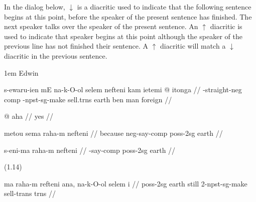 \documentclass[12pt]{article}
\begin{document}
In the dialog below, $\downarrow$ is a diacritic used to indicate that the
following sentence begins at this point, before the speaker of the present
sentence has finished.  The next speaker talks over the speaker of the present
sentence. An $\uparrow$ diacritic is used to indicate that speaker begins at
this point although the speaker of the previous line has not finished their
sentence. A $\uparrow$ diacritic will match a $\downarrow$ diacritic in the
previous sentence.

\bigskip

 1em Edwin

\begingl
\gla s-ewaru-ien mE na-k-O-ol selem nefteni kam ietemi \nogloss{$\downarrow$} @ itonga //
-straight-{\sc neg} {\sc comp} {-npst-sg}-make
   sell.{\sc trns} earth {\sc ben} man foreign //
\endgl
\endspeaker

\begingl
\gla \nogloss{$\uparrow$} @ aha //
\glb yes //
\endgl
\endspeaker

\begingl
\gla metou sema raha-m nefteni //
\glb because {\sc neg}-say-{\sc comp} {\sc poss-2sg} earth //
\endgl
\endspeaker

\begingl
\gla s-eni-ma raha-m nefteni //
-say-{\sc comp} {\sc poss-2sg} earth //
\endgl
\endspeaker

\speaker{}
(1.14)
\endspeaker

\speaker{}
\begingl
\gla ma raha-m refteni ana, na-k-O-ol selem i //
 {\sc poss-2sg} earth still {2-npst-sg}-make
sell-{\sc trans} {\sc trns} //
\endgl
\endspeaker
\end{document}
